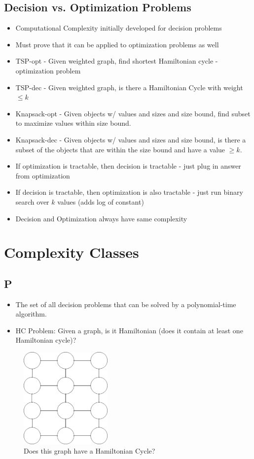 \documentclass[12pt, letter]{article}
\begin{document}
\subsection*{Decision vs. Optimization Problems}
\begin{itemize}
	\item Computational Complexity initially developed for decision problems
	\item Must prove that it can be applied to optimization problems as well
	\item TSP-opt - Given weighted graph, find shortest Hamiltonian cycle - optimization problem
	\item TSP-dec - Given weighted graph, is there a Hamiltonian Cycle with weight $\le k$
	\item Knapsack-opt - Given objects w/ values and sizes and size bound, find subset to maximize values within size bound.
	\item Knapsack-dec - Given objects w/ values and sizes and size bound, is there a subset of the objects that are within the size bound and have a value $\ge k$.
	\item If optimization is tractable, then decision is tractable - just plug in answer from optimization
	\item If decision is tractable, then optimization is also tractable - just run binary search over $k$ values (adds log of constant)
	\item Decision and Optimization always have same complexity
\end{itemize}

\section{Complexity Classes}%
\label{sec:complexity_classes}
\subsection*{P}
\begin{itemize}
	\item The set of all decision problems that can be solved by a polynomial-time algorithm.
	\item HC Problem: Given a graph, is it Hamiltonian (does it contain at least one Hamiltonian cycle)?
\end{itemize}
\begin{figure}[h]
	\centering
	\includegraphics[width=0.4\textwidth]{imgs/hc}
	\caption{Does this graph have a Hamiltonian Cycle?}
	\label{fig:imgs-hc}
\end{figure}
\end{document}
